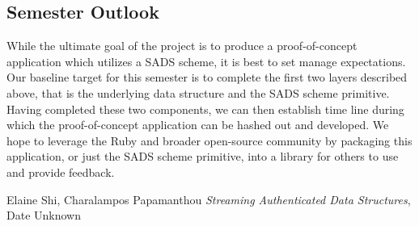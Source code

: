 \documentclass[11pt, letterpaper, oneside]{article}
\begin{document}
	\subsection{Semester Outlook}
		While the ultimate goal of the project is to produce a proof-of-concept application which utilizes a SADS scheme, it is best to set manage expectations.
		Our baseline target for this semester is to complete the first two layers described above, that is the underlying data structure and the SADS scheme primitive.
		Having completed these two components, we can then establish time line during which the proof-of-concept application can be hashed out and developed.
		We hope to leverage the Ruby and broader open-source community by packaging this application, or just the SADS scheme primitive, into a library for others to use and provide feedback.



\begin{thebibliography}{9}
	 Elaine Shi, Charalampos Papamanthou \emph{Streaming Authenticated Data Structures}, Date Unknown
\end{thebibliography}
\end{document}
